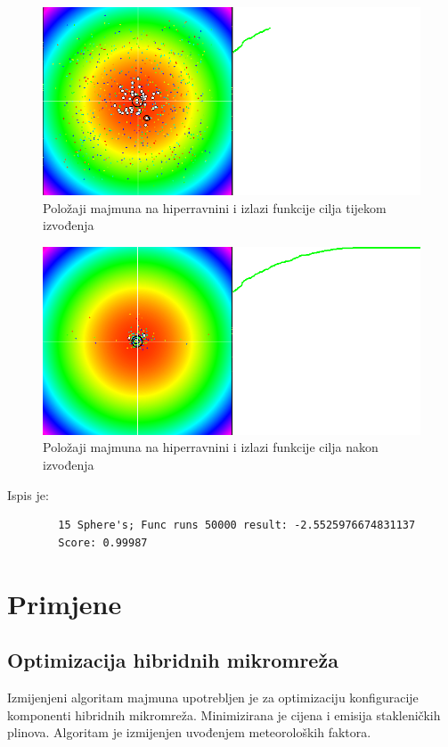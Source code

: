 \begin{figure}[H]
	\centering
	\includegraphics[width=14cm]{mt54}
	\caption{Položaji majmuna na hiperravnini i izlazi funkcije cilja tijekom izvođenja}
	\centering
\end{figure}

\begin{figure}[H]
	\centering
	\includegraphics[width=14cm]{mt55}
	\caption{Položaji majmuna na hiperravnini i izlazi funkcije cilja nakon izvođenja}
	\centering
\end{figure}

\noindent Ispis je:
\begin{framed}
	\begin{verbatim}
		15 Sphere's; Func runs 50000 result: -2.5525976674831137
		Score: 0.99987
	\end{verbatim}
\end{framed}








\section{Primjene}

\subsection{Optimizacija hibridnih mikromreža}
Izmijenjeni algoritam majmuna upotrebljen je za optimizaciju konfiguracije komponenti hibridnih mikromreža.\cite{ITUARTEVILLARREAL2012344} Minimizirana je cijena i emisija stakleničkih plinova. Algoritam je izmijenjen uvođenjem meteoroloških faktora.


